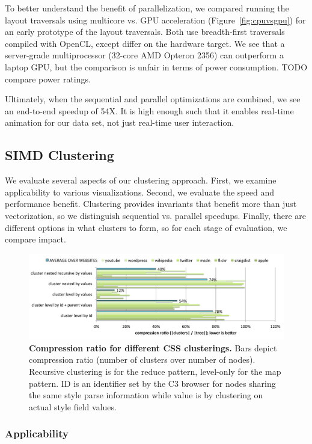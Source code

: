 To better understand the benefit of parallelization, we compared running the layout traversals using multicore vs. GPU acceleration (Figure~\ref{fig:cpuvsgpu}) for an early prototype of the layout traversals. Both use breadth-first traversals compiled with OpenCL, except differ on the hardware target. We see that a server-grade multiprocessor (32-core AMD Opteron 2356) can outperform a laptop GPU, but the comparison is unfair in terms of power consumption. TODO compare power ratings.


Ultimately, when the sequential and parallel optimizations are combined, we see an end-to-end speedup of 54X. It is high enough such that it enables real-time animation for our data set, not just real-time user interaction.


\subsection{SIMD Clustering}
We evaluate several aspects of our clustering approach. First, we examine applicability to various visualizations. Second, we evaluate the speed and performance benefit. Clustering provides invariants that benefit more than just vectorization, so we distinguish sequential vs. parallel speedups. Finally, there are different options in what clusters to form, so for each stage of evaluation, we compare impact.

\begin{figure}
\centering
\includegraphics[trim=0 0 0 0,clip,width=1.0\columnwidth]{chapter6/csscompression}
\caption{\textbf{Compression ratio for different CSS clusterings.} Bars depict compression ratio (number of clusters over number of nodes). Recursive clustering is for the reduce pattern, level-only for the map pattern. ID is an identifier set by the C3 browser for nodes sharing the same style parse information while value is by clustering on actual style field values.}
\label{fig:csscompression}
\end{figure}




\subsubsection{Applicability}


